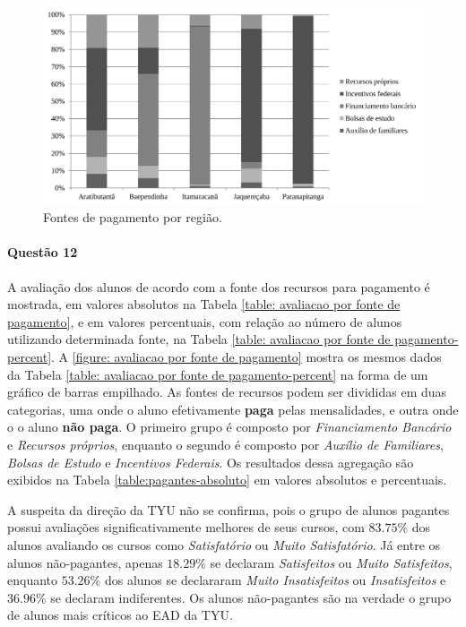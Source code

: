 \documentclass[10pt,a4paper,oneside]{article}
\begin{document}
\begin{figure}
\centering
	\includegraphics[width=0.80\linewidth]{plots/q11}
	\caption{Fontes de pagamento por região.}
	\label{figure: fonte de pagemento}
\end{figure}

\FloatBarrier
\paragraph{Questão 12}

A avaliação dos alunos de acordo com a fonte dos recursos para pagamento é mostrada, em valores absolutos na Tabela \ref{table: avaliacao por fonte de pagamento}, e em valores percentuais, com relação ao número de alunos utilizando determinada fonte, na Tabela \ref{table: avaliacao por fonte de pagamento-percent}. A \ref{figure: avaliacao por fonte de pagamento} mostra os mesmos dados da Tabela \ref{table: avaliacao por fonte de pagamento-percent} na forma de um gráfico de barras empilhado. As fontes de recursos podem ser divididas em duas categorias, uma onde o aluno efetivamente \textbf{paga} pelas mensalidades, e outra onde o o aluno \textbf{não paga}. O primeiro grupo é composto por \textit{Financiamento Bancário} e \textit{Recursos próprios}, enquanto o segundo é composto por \textit{Auxílio de Familiares}, \textit{Bolsas de Estudo} e \textit{Incentivos Federais}. Os resultados dessa agregação são exibidos na Tabela \ref{table:pagantes-absoluto} em valores absolutos e percentuais.

A suspeita da direção da TYU não se confirma, pois o grupo de alunos pagantes possui avaliações significativamente melhores de seus cursos, com $83.75\%$ dos alunos avaliando os cursos como \textit{Satisfatório} ou \textit{Muito Satisfatório}. Já entre os alunos não-pagantes, apenas $18.29\%$ se declaram \textit{Satisfeitos} ou \textit{Muito Satisfeitos}, enquanto $53.26\%$ dos alunos se declararam \textit{Muito Insatisfeitos} ou \textit{Insatisfeitos} e $36.96\%$ se declaram indiferentes. Os alunos não-pagantes são na verdade o grupo de alunos mais críticos ao EAD da TYU.
\end{document}
